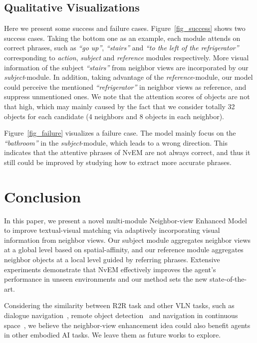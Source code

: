 \documentclass[sigconf]{acmart}
\begin{document}
\vspace{3mm}
\subsection{Qualitative Visualizations}
Here we present some success and failure cases.
Figure~\ref{fig_success} shows two success cases. Taking the bottom one as an example, each module attends on correct phrases, such as \textit{``go up''}, \textit{``stairs''} and \textit{``to the left of the refrigerator''} corresponding to \textit{action}, \textit{subject} and \textit{reference} modules respectively. 
More visual information of the subject \textit{``stairs''} from neighbor views are incorporated by our \textit{subject}-module. 
In addition, taking advantage of the \textit{reference}-module, our model could perceive the mentioned \textit{``refrigerator''} in neighbor views as reference, and suppress unmentioned ones.
We note that the attention scores of objects are not that high, which may mainly caused by the fact that we consider totally 32 objects  for each candidate (4 neighbors and 8 objects in each neighbor). 


Figure~\ref{fig_failure} visualizes a failure case. The model mainly focus on the \textit{``bathroom''} in the \textit{subject}-module, which leads to a wrong direction. This indicates that the attentive phrases of NvEM are not always correct, and thus it still could be improved by studying how to extract more accurate phrases.



\section{Conclusion}
In this paper, we present a novel multi-module Neighbor-view Enhanced Model to improve textual-visual matching via adaptively incorporating   visual information from neighbor views. Our subject module   aggregates neighbor views at a global level based on spatial-affinity, and our reference module aggregates neighbor objects at a local level guided by referring phrases.
Extensive experiments demonstrate that NvEM effectively improves the agent's performance in unseen environments and our method sets the new state-of-the-art. 


Considering the similarity between R2R task and other VLN tasks, such as dialogue navigation~\cite{thomas2019dialogue,khanh2019help}, remote object detection~\cite{qi2020reverie} and navigation in continuous space~\cite{jacob2020vlnce}, we believe the neighbor-view enhancement idea could also benefit agents in other embodied AI tasks. We leave them as future works to explore.
\end{document}
